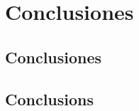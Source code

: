 
\cleardoublepage


\chapter{Conclusiones}
\label{makereference6}

\section{Conclusiones}
\label{makereference6.1}

\section{Conclusions}
\label{makereference6.2}